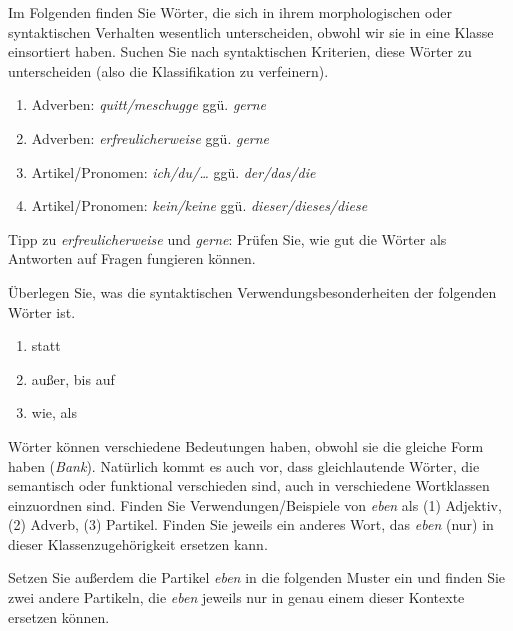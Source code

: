 \Uebung[\tristar] \label{u52} Im Folgenden finden Sie Wörter, die sich in ihrem morphologischen oder syntaktischen Verhalten wesentlich unterscheiden, obwohl wir sie in eine Klasse einsortiert haben.
Suchen Sie nach syntaktischen Kriterien, diese Wörter zu unterscheiden (also die Klassifikation zu verfeinern).

\begin{enumerate}\Lf
  \item Adverben: \textit{quitt/meschugge} ggü. \textit{gerne}
  \item Adverben: \textit{erfreulicherweise} ggü. \textit{gerne}
  \item Artikel/Pronomen: \textit{ich/du/\ldots} ggü. \textit{der/das/die}
  \item Artikel/Pronomen: \textit{kein/keine} ggü. \textit{dieser/dieses/diese}
\end{enumerate}

Tipp zu \textit{erfreulicherweise} und \textit{gerne}:
Prüfen Sie, wie gut die Wörter als Antworten auf Fragen fungieren können.

\Uebung[\tristar] \label{u53} Überlegen Sie, was die syntaktischen Verwendungsbesonderheiten der folgenden Wörter ist.

\begin{enumerate}\Lf
  \item statt
  \item außer, bis auf
  \item wie, als
\end{enumerate}

\Uebung \label{u54} Wörter können verschiedene Bedeutungen haben, obwohl sie die gleiche Form haben (\zB \textit{Bank}).
Natürlich kommt es auch vor, dass gleichlautende Wörter, die semantisch oder funktional verschieden sind, auch in verschiedene Wortklassen einzuordnen sind.
Finden Sie Verwendungen/Beispiele von \textit{eben} als (1) Adjektiv, (2) Adverb, (3) Partikel.
Finden Sie jeweils ein anderes Wort, das \textit{eben} (nur) in dieser Klassenzugehörigkeit ersetzen kann.

Setzen Sie außerdem die Partikel \textit{eben} in die folgenden Muster ein und finden Sie zwei andere Partikeln, die \textit{eben} jeweils nur in genau einem dieser Kontexte ersetzen können.

\begin{exe}
\end{exe}

